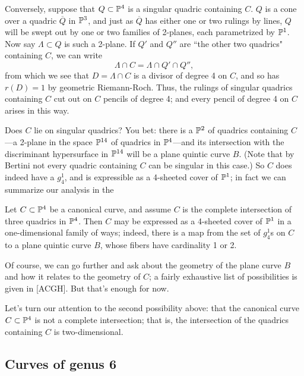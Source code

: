 \documentclass[12pt, leqno]{article}
\begin{document}
Conversely, suppose that $Q \subset {\mathbb P}^4$ is a singular quadric containing $C$. $Q$ is a cone over a quadric $\overline Q$ in ${\mathbb P}^3$, and just as $\overline Q$ has either one or two rulings by lines, $Q$ will be swept out by one or two families of 2-planes, each parametrized by ${\mathbb P}^1$. Now say $\Lambda \subset Q$ is such a 2-plane. If $Q'$ and $Q''$ are ``the other two quadrics" containing $C$, we can write
$$
\Lambda \cap C = \Lambda \cap Q' \cap Q'', 
$$ 
from which we see that $D = \Lambda \cap C$ is a divisor of degree 4 on $C$, and so has $r(D) = 1$ by geometric Riemann-Roch. Thus, the rulings of  singular quadrics containing $C$ cut out on $C$ pencils of degree 4; and every pencil of degree 4 on $C$ arises in this way.

Does $C$ lie on singular quadrics? You bet: there is a ${\mathbb P}^2$ of quadrics containing $C$---a 2-plane in the space ${\mathbb P}^{14}$ of quadrics in ${\mathbb P}^4$---and its intersection with the discriminant hypersurface in ${\mathbb P}^{14}$ will be a plane quintic curve $B$. (Note that by Bertini not every quadric containing $C$ can be singular in this case.) So $C$ does indeed have a $g^1_4$, and is expressible as a 4-sheeted cover of ${\mathbb P}^1$; in fact we can summarize our analysis in the

\begin{proposition}
Let $C \subset {\mathbb P}^4$ be a canonical curve, and assume $C$ is the complete intersection of three quadrics in ${\mathbb P}^4$. Then $C$ may be expressed as a 4-sheeted cover of ${\mathbb P}^1$ in a one-dimensional family of ways; indeed, there is a map from the set of $g^1_4$s on $C$ to a plane quintic curve $B$, whose fibers have cardinality 1 or 2.
\end{proposition}

Of course, we can go further and ask about the geometry of the plane curve $B$ and how it relates to the geometry of $C$; a fairly exhaustive list of possibilities is given in \cite{****} [ACGH]. But that's enough for now.

Let's turn our attention to the second possibility above: that the canonical curve $C \subset {\mathbb P}^4$ is not a complete intersection; that is, the intersection of the quadrics containing $C$ is two-dimensional.

\subsection{Curves of genus 6}
\end{document}
